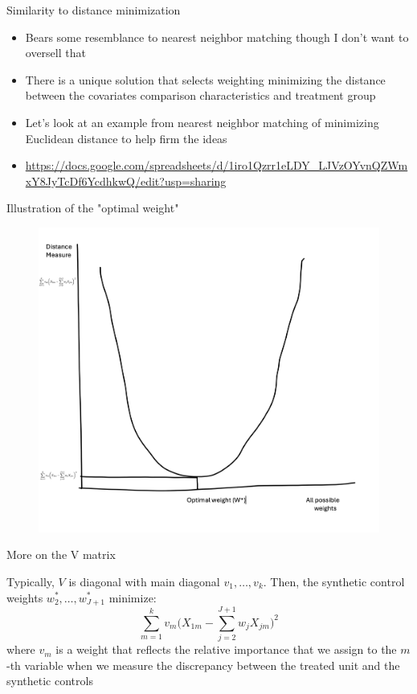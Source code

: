 \documentclass{beamer}
\begin{document}
\begin{frame}{Similarity to distance minimization}

\begin{itemize}
\item Bears some resemblance to nearest neighbor matching though I don't want to oversell that
\item There is a unique solution that selects weighting minimizing the distance between the covariates comparison characteristics and treatment group
\item Let's look at an example from nearest neighbor matching of minimizing Euclidean distance to help firm the ideas
\item \url{https://docs.google.com/spreadsheets/d/1iro1Qzrr1eLDY_LJVzOYvnQZWmxY8JyTcDf6YcdhkwQ/edit?usp=sharing}
\end{itemize}

\end{frame}

\begin{frame}{Illustration of the "optimal weight"}

\begin{figure}
\includegraphics[scale=0.25]{./lecture_includes/synth_optimal_weight}
\end{figure}

\end{frame}



\begin{frame}{More on the V matrix}

Typically, $V$ is diagonal with main diagonal $v_1, \dots, v_k$.  Then, the synthetic control weights $w_2^*, \dots, w_{J+1}^*$ minimize: $$\sum_{m=1}^k v_m \bigg(X_{1m} - \sum_{j=2}^{J+1}w_jX_{jm}\bigg)^2$$ where $v_m$ is a weight that reflects the relative importance that we assign to the $m$-th variable when we measure the discrepancy between the treated unit and the synthetic controls

\end{frame}
\end{document}
